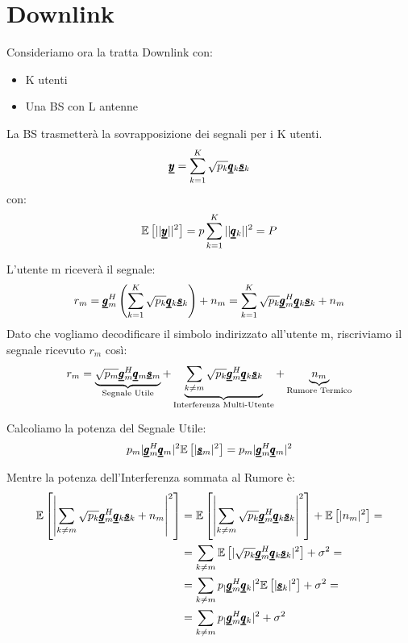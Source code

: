 \section{Downlink}
Consideriamo ora la tratta Downlink con:\\
\begin{itemize}
    \item K utenti
    \item Una BS con L antenne
\end{itemize}
La BS trasmetterà la sovrapposizione dei segnali per i K utenti.
\begin{equation*}
    \pmb{\underline{y}} = \sum_{k=1}^K \sqrt{p_k} \pmb{\underline{q}}_k \pmb{\underline{s}}_k
\end{equation*}
con:
\begin{equation*}
    \mathbb{E}\left[||\pmb{\underline{y}}||^2\right] = p \sum_{k=1}^K ||\pmb{\underline{q}}_k||^2 = P
\end{equation*}

L'utente m riceverà il segnale:
\begin{equation*}
    r_m = \pmb{\underline{g}}_m^H \left(\sum_{k=1}^K \sqrt{p_k} \pmb{\underline{q}}_k \pmb{\underline{s}}_k \right) + n_m = \sum_{k=1}^K \sqrt{p_k}\pmb{\underline{g}}_m^H\pmb{\underline{q}}_k \pmb{\underline{s}}_k + n_m
\end{equation*}
Dato che vogliamo decodificare il simbolo indirizzato all'utente m, riscriviamo il segnale ricevuto $r_m$ così:
\begin{equation*}
    r_m = \underbrace{\sqrt{p_m}\pmb{\underline{g}}_m^H\pmb{\underline{q}}_m \pmb{\underline{s}}_m}_{\text{Segnale Utile}} + \underbrace{\sum_{k \neq m} \sqrt{p_k}\pmb{\underline{g}}_m^H\pmb{\underline{q}}_k \pmb{\underline{s}}_k}_{\text{Interferenza Multi-Utente}} + \underbrace{n_m}_{\text{Rumore Termico}}
\end{equation*}

Calcoliamo la potenza del Segnale Utile:
\begin{equation*}
    p_m|\pmb{\underline{g}}_m^H\pmb{\underline{q}}_m|^2 \mathbb{E}\left[|\pmb{\underline{s}}_m|^2\right] =    p_m|\pmb{\underline{g}}_m^H\pmb{\underline{q}}_m|^2
\end{equation*}

Mentre la potenza dell'Interferenza sommata al Rumore è:
\begin{equation*}
    \begin{aligned}
    \mathbb{E}\left[\left|\sum_{k \neq m} \sqrt{p_k}\pmb{\underline{g}}_m^H\pmb{\underline{q}}_k \pmb{\underline{s}}_k +n_m \right|^2\right] &= \mathbb{E}\left[\left|\sum_{k \neq m} \sqrt{p_k}\pmb{\underline{g}}_m^H\pmb{\underline{q}}_k \pmb{\underline{s}}_k \right|^2\right] + \mathbb{E}\left[|n_m|^2\right] = \\
    &= \sum_{k \neq m} \mathbb{E}\left[|\sqrt{p_k}\pmb{\underline{g}}_m^H\pmb{\underline{q}}_k \pmb{\underline{s}}_k|^2\right] + \sigma^2 = \\
    &= \sum_{k \neq m} p_ |\pmb{\underline{g}}_m^H\pmb{\underline{q}}_k|^2 \mathbb{E}\left[|\pmb{\underline{s}}_k|^2\right] +\sigma^2 = \\
    &=  \sum_{k \neq m} p_ |\pmb{\underline{g}}_m^H\pmb{\underline{q}}_k|^2  +\sigma^2
    \end{aligned}
\end{equation*}

